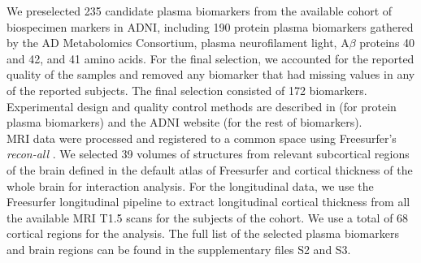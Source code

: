 \begin{table}[!htbp]
\centering
{}
\caption[Demographic information of the studied cohort at baseline.]{Demographic information of the studied cohort at baseline. Categorical variables are expressed as counts and percentages. Continuous variables are expressed as mean $\pm$ standard deviation. CN: Cognitive normal. MCI: Mild cognitive impairment. AD: Alzheimer's disease. APOE $\varepsilon4$: Apolipoprotein $\varepsilon4$.  MMSE: mini-mental state examination.}
\label{tab:data}
\end{table}

We preselected 235 candidate plasma biomarkers from the available cohort of biospecimen markers in ADNI, including 190 protein plasma biomarkers gathered by the AD Metabolomics Consortium, plasma neurofilament light, A$\beta$ proteins 40 and 42, and 41 amino acids. For the final selection, we accounted for the reported quality of the samples and removed any biomarker that had missing values in any of the reported subjects. The final selection consisted of 172 biomarkers. Experimental design and quality control methods are described in \cite{DataPrimer} (for protein plasma biomarkers) and the ADNI website (for the rest of biomarkers). \\

MRI data were processed and registered to a common space using Freesurfer's \textit{recon-all} \cite{Fischl2012}. We selected 39 volumes of structures from relevant subcortical regions of the brain defined in the default atlas of Freesurfer \cite{Fischl2002} and cortical thickness of the whole brain for interaction analysis. For the longitudinal data, we use the Freesurfer longitudinal pipeline \cite{Reuter2012} to extract longitudinal cortical thickness from all the available MRI T1.5 scans for the subjects of the cohort. We use a total of 68 cortical regions for the analysis. The full list of the selected plasma biomarkers and brain regions can be found in the supplementary files S2 and S3. \\

